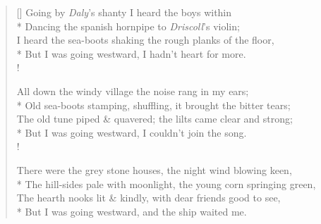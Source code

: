 \documentclass[MAIN]{subfiles}
\begin{document}
\begin{verse}[\versewidth]
Going by \emph{Daly}'s shanty I heard the boys within\\*
Dancing the spanish hornpipe to \emph{Driscoll}'s violin;\\
I heard the sea-boots shaking the rough planks of the floor,\\*
But I was going westward, I hadn't heart for more.\\!

All down the windy village the noise rang in my ears;\\*
Old sea-boots stamping, shuffling, it brought the bitter tears;\\
The old tune piped \& quavered; the lilts came clear and strong;\\* 
But I was going westward, I couldn't join the song.\\!

There were the grey stone houses, the night wind blowing keen,\\*
The hill-sides pale with moonlight, the young corn springing green,\\
The hearth nooks lit \& kindly, with dear friends good to see,\\*
But I was going westward, and the ship waited me.
\end{verse}
\end{document}
